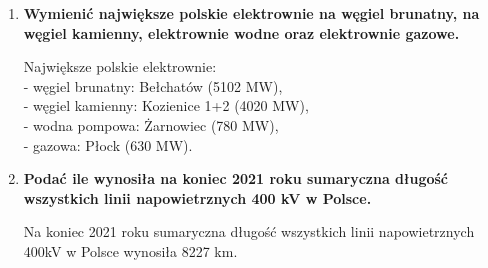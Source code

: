 \documentclass[12pt]{article}
\newcommand{\pytanie}[1]{\item \textbf{#1}}
\begin{document}
\begin{enumerate}
    \pytanie{Wymienić największe polskie elektrownie na węgiel brunatny, na węgiel kamienny, elektrownie wodne oraz elektrownie gazowe.}
    
        Największe polskie elektrownie:\\
        - węgiel brunatny: Bełchatów (5102 MW),\\
        - węgiel kamienny: Kozienice 1+2 (4020 MW),\\
        - wodna pompowa: Żarnowiec (780 MW),\\
        - gazowa: Płock (630 MW).

    \pytanie{Podać ile wynosiła na koniec 2021 roku sumaryczna długość wszystkich linii napowietrznych 400 kV w Polsce.}
    
        Na koniec 2021 roku sumaryczna długość wszystkich linii napowietrznych 400kV w Polsce wynosiła 8227 km.

\end{enumerate}

\newpage
\end{document}
